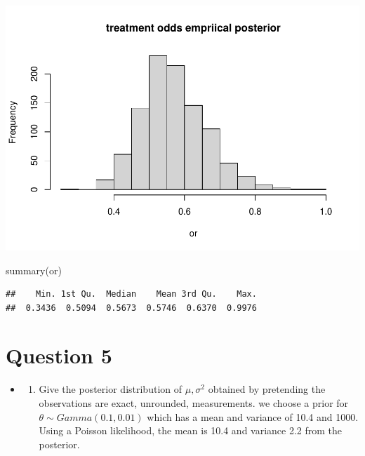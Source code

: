 \documentclass[
]{book}
\newenvironment{Shaded}{\begin{snugshade}}{\end{snugshade}}
\newcommand{\FunctionTok}[1]{\textcolor[rgb]{0.00,0.00,0.00}{#1}}
\newcommand{\NormalTok}[1]{#1}
\providecommand{\tightlist}{%
  \setlength{\itemsep}{0pt}\setlength{\parskip}{0pt}}
\theoremstyle{definition}
\theoremstyle{definition}
\theoremstyle{definition}
\theoremstyle{definition}
\theoremstyle{remark}
\begin{document}
\includegraphics{_main_files/figure-latex/unnamed-chunk-38-2.pdf}

\begin{Shaded}
\begin{Highlighting}[]
  \FunctionTok{summary}\NormalTok{(or)}
\end{Highlighting}
\end{Shaded}

\begin{verbatim}
##    Min. 1st Qu.  Median    Mean 3rd Qu.    Max. 
##  0.3436  0.5094  0.5673  0.5746  0.6370  0.9976
\end{verbatim}

\hypertarget{question-5}{%
\section*{Question 5}\label{question-5}}

\begin{itemize}
\item
  \begin{enumerate}
  \def\labelenumi{(\alph{enumi})}
  \tightlist
  \item
    Give the posterior distribution of \(\mu, \sigma^2\) obtained by pretending the observations are exact, unrounded, measurements. we choose a prior for \(\theta \sim Gamma(0.1,0.01)\) which has a mean and variance of 10.4 and 1000. Using a Poisson likelihood, the mean is 10.4 and variance 2.2 from the posterior.
  \end{enumerate}
\end{itemize}
\end{document}
